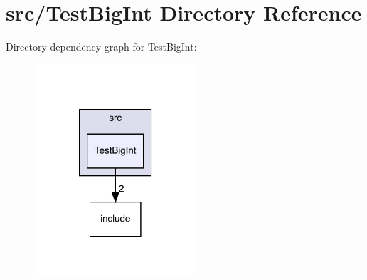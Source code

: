 \section{src/\+Test\+Big\+Int Directory Reference}
\label{dir_2174880164a8a2c1d6599a4ba33555e0}
Directory dependency graph for Test\+Big\+Int\+:\nopagebreak
\begin{figure}[H]
\begin{center}
\leavevmode
\includegraphics[width=172pt]{dir_2174880164a8a2c1d6599a4ba33555e0_dep}
\end{center}
\end{figure}
